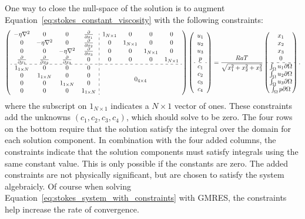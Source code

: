 One way to close the null-space of the solution is to augment Equation~\ref{eq:stokes_constant_viscosity} with the following constraints: 
\begin{align}
\left(\begin{array}{cccc:cccc}  
-\eta \Laplacian & 0 & 0 & \pd{}{x_1} & 1_{N \times 1} & 0 & 0 & 0 \\ 
0 & -\eta \Laplacian & 0 & \pd{}{x_2} & 0 & 1_{N \times 1} & 0 & 0\\ 
0 & 0 & -\eta \Laplacian & \pd{}{x_3} & 0 & 0 & 1_{N \times 1} & 0\\ 
\pd{}{x_1} & \pd{}{x_2} & \pd{}{x_3} & 0 & 0 & 0 & 0 & 1_{N \times 1}\\
\hdashline
1_{1 \times N} & 0 & 0 & 0 & \multicolumn{4}{c}{\multirow{4}{*}{$0_{4 \times 4}$}} \\
0 & 1_{1 \times N} & 0 & 0 & \\
0 & 0 & 1_{1 \times N} & 0 & \\ 
0 & 0 & 0 & 1_{1 \times N} & \\
\end{array} \right) \left(\begin{array}{c} 
u_1 \\ u_2 \\ u_3 \\ p \\ \hdashline c_1 \\ c_2 \\ c_3 \\ c_4
\end{array} \right) = \frac{RaT}{\sqrt{x_1^2 + x_2^2 + x_3^2}}\begin{pmatrix} x_1 \\ x_2 \\ x_3 \\ 0 \\ \hdashline \int_\Omega u_1 \partial\Omega \\ \int_\Omega u_2 \partial\Omega \\ \int_\Omega u_3 \partial\Omega \\ \int_\Omega p \partial\Omega \end{pmatrix}.
\label{eq:stokes_system_with_constraints}
\end{align}
where the subscript on $1_{N \times 1}$ indicates a $N \times 1$ vector of ones. These constraints add the unknowns $(c_1, c_2, c_3, c_4)$, which should solve to be zero. The four rows on the bottom require that the solution satisfy the integral over the domain for each solution component. In combination with the four added columns, the constraints indicate that the solution components must satisfy integrals using the same constant value. This is only possible if the constants are zero. The added constraints are not physically significant, but are chosen to satisfy the system algebraicly. Of course when solving Equation~\ref{eq:stokes_system_with_constraints} with GMRES, the constraints help increase the rate of convergence. 

